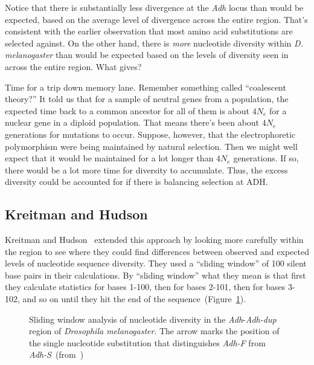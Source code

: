 Notice that there is substantially less divergence at the {\it Adh\/}
locus than would be expected, based on the average level of divergence
across the entire region. That's consistent with the earlier
observation that most amino acid substitutions are selected
against. On the other hand, there is {\it more\/} nucleotide diversity
within {\it D. melanogaster\/} than would be expected based on the
levels of diversity seen in across the entire region. What gives?

Time for a trip down memory lane. Remember something called
``coalescent theory?'' It told us that for a sample of neutral genes
from a population, the expected time back to a common ancestor for all
of them is about $4N_e$ for a nuclear gene in a diploid
population. That means there's been about $4N_e$ generations for
mutations to occur. Suppose, however, that the electrophoretic
polymorphism were being maintained by natural selection. Then we might
well expect that it would be maintained for a lot longer than $4N_e$
generations. If so, there would be a lot more time for diversity to
accumulate. Thus, the excess diversity could be accounted for if there
is balancing selection at ADH.

\subsection*{Kreitman and Hudson}

Kreitman and Hudson~\cite{Kreitman-Hudson91} extended this approach by
looking more carefully within the region to see where they could find
differences between observed and expected levels of nucleotide
sequence diversity. They used a ``sliding window'' of 100 silent base
pairs in their calculations. By ``sliding window'' what they mean is
that first they calculate statistics for bases 1-100, then for bases
2-101, then for bases 3-102, and so on until they hit the end of the
sequence~(Figure~\ref{fig:kh}). 

\begin{figure}
\begin{center}
\end{center}
\caption{Sliding window analysis of nucleotide diversity in the {\it
    Adh\/}-{\it Adh-dup} region of {\it Drosophila melanogaster}. The
  arrow marks the position of the single nucleotide substitution that
  distinguishes {\it Adh-F\/} from {\it
    Adh-S\/}~(from~\cite{Kreitman-Hudson91})}\label{fig:kh}
\end{figure}

